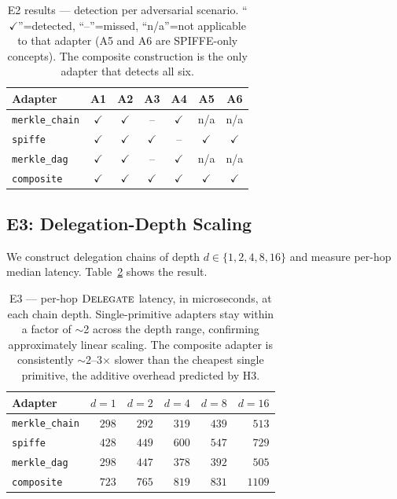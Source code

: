 \documentclass[11pt,a4paper]{article}
\begin{document}
\begin{table}[h]
\centering
\small
\caption{E2 results --- detection per adversarial scenario.
``$\checkmark$''=detected, ``--''=missed, ``n/a''=not applicable to that
adapter (A5 and A6 are SPIFFE-only concepts). The composite construction
is the only adapter that detects all six.}\label{tab:e2}
\begin{tabular}{lcccccc}
\toprule
Adapter & A1 & A2 & A3 & A4 & A5 & A6 \\
\midrule
\texttt{merkle\_chain} & $\checkmark$ & $\checkmark$ & --           & $\checkmark$ & n/a          & n/a \\
\texttt{spiffe}        & $\checkmark$ & $\checkmark$ & $\checkmark$ & --           & $\checkmark$ & $\checkmark$ \\
\texttt{merkle\_dag}   & $\checkmark$ & $\checkmark$ & --           & $\checkmark$ & n/a          & n/a \\
\texttt{composite}     & $\checkmark$ & $\checkmark$ & $\checkmark$ & $\checkmark$ & $\checkmark$ & $\checkmark$ \\
\bottomrule
\end{tabular}
\end{table}

\subsection{E3: Delegation-Depth Scaling}\label{sec:e3}

We construct delegation chains of depth $d \in \{1, 2, 4, 8, 16\}$ and
measure per-hop median latency. Table~\ref{tab:e3} shows the result.

\begin{table}[h]
\centering
\small
\caption{E3 --- per-hop $\textsc{Delegate}$ latency, in microseconds, at
each chain depth. Single-primitive adapters stay within a factor of
$\sim$2 across the depth range, confirming approximately linear scaling.
The composite adapter is consistently $\sim$2--3$\times$ slower than the
cheapest single primitive, the additive overhead predicted by
H3.}\label{tab:e3}
\begin{tabular}{lrrrrr}
\toprule
Adapter & $d=1$ & $d=2$ & $d=4$ & $d=8$ & $d=16$ \\
\midrule
\texttt{merkle\_chain} & $298$  & $292$  & $319$  & $439$  & $513$   \\
\texttt{spiffe}        & $428$  & $449$  & $600$  & $547$  & $729$   \\
\texttt{merkle\_dag}   & $298$  & $447$  & $378$  & $392$  & $505$   \\
\texttt{composite}     & $723$  & $765$  & $819$  & $831$  & $1109$  \\
\bottomrule
\end{tabular}
\end{table}
\end{document}
